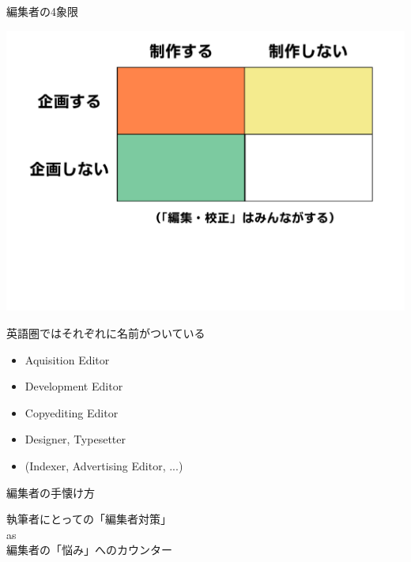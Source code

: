 \documentclass[14pt,dvipdfmx,uplatex]{beamer}
\begin{document}
\begin{frame}[t]{\inhibitglue 編集者の4象限}
  \sffamily
  \begin{center}
  \includegraphics[height=0.9\paperheight]{figures/4segment.pdf}
  \end{center}
\end{frame}

\begin{frame}[t]{\inhibitglue 英語圏ではそれぞれに名前がついている}
  \sffamily\bfseries
  \begin{itemize}
    \item Aquisition Editor
    \item Development Editor
    \item Copyediting Editor
    \item Designer, Typesetter
    \item (Indexer, Advertising Editor, ...)
  \end{itemize}
\end{frame}

\begin{frame}[t]{\inhibitglue 編集者の手懐け方}
    \vfill
  \begin{center}
    \color{kachi}\yasagoth
    執筆者にとっての「編集者対策」\\
    as \\
    編集者の「悩み」へのカウンター
  \end{center}
    \vfill
\end{frame}
\end{document}
